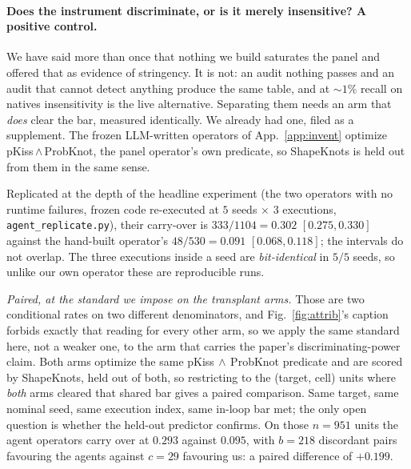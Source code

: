 \documentclass[11pt]{article}
\begin{document}
\paragraph{Does the instrument discriminate, or is it merely insensitive? A positive control.} We have said
more than once that nothing we build saturates the panel and offered that as evidence of stringency. It is
not: an audit nothing passes and an audit that cannot detect anything produce the same table, and at
$\sim\!1\%$ recall on natives insensitivity is the live alternative. Separating them needs an arm that
\emph{does} clear the bar, measured identically. We already had one, filed as a supplement. The frozen
LLM-written operators of App.~\ref{app:invent} optimize pKiss\,$\wedge$\,ProbKnot, the panel operator's own
predicate, so ShapeKnots is held out from them in the same sense.

Replicated at the depth of the headline experiment (the two operators with no runtime failures, frozen code
re-executed at $5$ seeds $\times$ $3$ executions, \texttt{agent\_replicate.py}), their carry-over is
$333/1104=\mathbf{0.302}$ $[0.275,0.330]$ against the hand-built operator's $48/530=0.091$ $[0.068,0.118]$;
the intervals do not overlap. The three executions inside a seed are \emph{bit-identical} in $5/5$ seeds, so
unlike our own operator these are reproducible runs.

\emph{Paired, at the standard we impose on the transplant arms.} Those are two conditional rates on two
different denominators, and Fig.~\ref{fig:attrib}'s caption forbids exactly that reading for every other arm,
so we apply the same standard here, not a weaker one, to the arm that carries the paper's discriminating-power claim. Both arms optimize the same pKiss$\,\wedge\,$ProbKnot predicate and are scored by
ShapeKnots, held out of both, so restricting to the (target, cell) units where \emph{both} arms cleared
that shared bar gives a paired comparison. Same target, same nominal seed, same execution index,
same in-loop bar met; the only open question is whether the held-out predictor confirms. On those
$n{=}951$ units the agent operators carry over at $0.293$ against $0.095$, with $b{=}218$ discordant pairs
favouring the agents against $c{=}29$ favouring us: a paired difference of ${+}0.199$.
\end{document}
